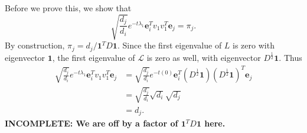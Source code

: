 \documentclass{article}
\newcommand{\incomplete}[1]{\textbf{INCOMPLETE: #1}}
\newcommand{\1}{\mathbf{1}}
\newcommand{\0}{\mathbf{0}}
\newcommand{\e}{\mathbf{e}}
\renewcommand{\L}{\mathcal{L}}
\begin{document}
\begin{enumerate}
\begin{enumerate}
    Before we prove this, we show that
    \begin{equation*}
      \sqrt{\frac{d_j}{d_i}} e^{-t \lambda_1} \e_i^T v_1 v_1^T \e_j = \pi_j.
    \end{equation*}
    By construction, $\pi_j = d_j / \1^T D \1$.
    Since the first eigenvalue of $L$ is zero with eigenvector $\1$, the first eigenvalue of $\L$ is zero as well, with eigenvector $D^{\frac{1}{2}} \1$.
    Thus
    \begin{align*}
      \sqrt{\frac{d_j}{d_i}} e^{-t \lambda_1} \e_i^T v_1 v_1^T \e_j & = \sqrt{\frac{d_j}{d_i}} e^{-t (0)} \e_i^T (D^{\frac{1}{2}} \1) (D^{\frac{1}{2}} \1)^T \e_j \\
      & = \sqrt{\frac{d_j}{d_i}} \sqrt{d_i} \sqrt{d_j} \\
      & = d_j.
    \end{align*}
    \incomplete{We are off by a factor of $\1^T D \1$ here.}


\end{enumerate}
\end{enumerate}
\end{document}
